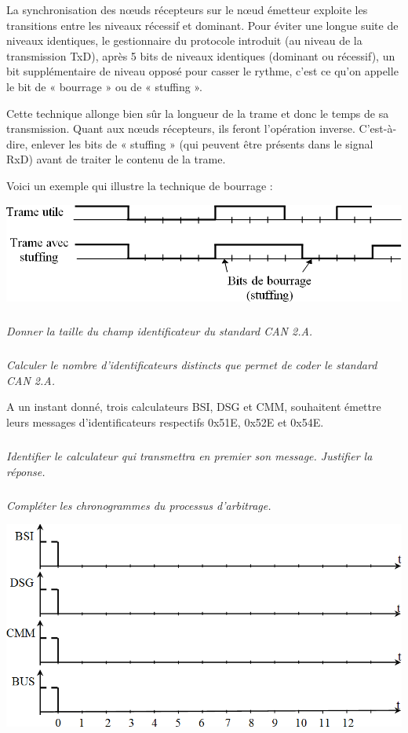 \documentclass[10pt]{article}
\begin{document}
La synchronisation des nœuds récepteurs sur le nœud émetteur exploite les transitions entre les niveaux récessif et dominant. Pour éviter une longue suite de niveaux identiques, le gestionnaire du protocole introduit (au niveau de la transmission TxD), après 5 bits de niveaux identiques (dominant ou récessif), un bit supplémentaire de niveau opposé pour casser le rythme, c’est ce qu’on appelle le bit de « bourrage » ou de « stuffing ».

Cette technique allonge bien sûr la longueur de la trame et donc le temps de sa transmission. Quant aux nœuds récepteurs, ils feront l’opération inverse. C'est-à-dire, enlever les bits de « stuffing » (qui peuvent être présents dans le signal RxD) avant de traiter le contenu de la trame.



Voici un exemple qui illustre la technique de bourrage :
\begin{center}
\includegraphics[width=.95\textwidth]{images/im_12}
\end{center}

\subparagraph{}
\textit{Donner la taille du champ identificateur du standard CAN 2.A.}
\subparagraph{}
\textit{Calculer le nombre d’identificateurs distincts que permet de coder le standard CAN 2.A.}

A un instant donné, trois calculateurs BSI, DSG et CMM, souhaitent émettre leurs messages d’identificateurs respectifs 0x51E, 0x52E et 0x54E.
\subparagraph{}
\textit{Identifier le calculateur qui transmettra en premier son message. Justifier la réponse.}

\subparagraph{}
\textit{Compléter les chronogrammes du processus d’arbitrage.}


\begin{center}
\includegraphics[width=.95\textwidth]{images/im_13}
\end{center}
\end{document}
